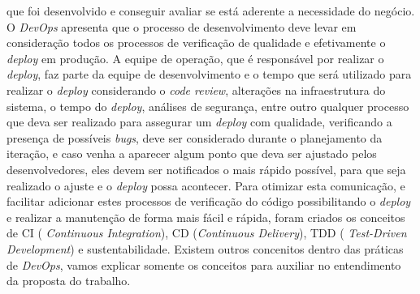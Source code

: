       que foi desenvolvido e conseguir avaliar se está aderente a necessidade do
      negócio. \newline
      O \textit{DevOps} apresenta que o processo de desenvolvimento deve levar em
      consideração todos os processos de verificação de qualidade e efetivamente
      o \textit{deploy} em produção. A equipe de operação, que é responsável por
      realizar o \textit{deploy}, faz parte da equipe de desenvolvimento e o tempo
      que será utilizado para realizar o \textit{deploy} considerando o
      \textit{code review}, alterações na infraestrutura do sistema, o tempo do
      \textit{deploy}, análises de segurança, entre outro qualquer processo que
      deva ser realizado para assegurar um \textit{deploy} com qualidade, verificando
      a presença de possíveis \textit{bugs}, deve ser considerado durante o
      planejamento da iteração, e caso venha a aparecer algum ponto que deva ser
      ajustado pelos desenvolvedores, eles devem ser notificados o mais rápido
      possível, para que seja realizado o ajuste e o \textit{deploy} possa acontecer. \newline
      Para otimizar esta comunicação, e facilitar adicionar estes processos de
      verificação do código possibilitando o \textit{deploy} e realizar a manutenção
      de forma mais fácil e rápida, foram criados os conceitos de CI (\textit{
      Continuous Integration}), CD (\textit{Continuous Delivery}), TDD (\textit{
      Test-Driven Development}) e sustentabilidade. Existem outros concenitos dentro
      das práticas de \textit{DevOps}, vamos explicar somente os conceitos para
      auxiliar no entendimento da proposta do trabalho.

